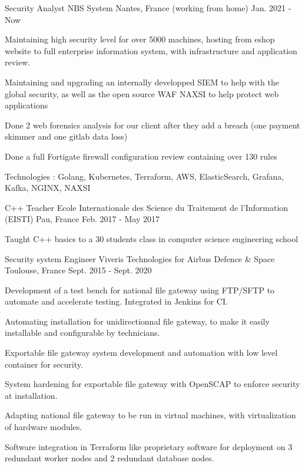 \begin{cventries}
  \cventry
  {Security Analyst}
  {NBS System}
  {Nantes, France (working from home)}
  {Jan. 2021 - Now}
  {
  \begin{cvitems}
    \item {Maintaining high security level for over 5000 machines, hosting from eshop website to full enterprise information system, with infrastructure and application review.}
    \item {Maintaining and upgrading an internally developped SIEM to help with the global security, as well as the open source WAF NAXSI to help protect web applications}
    \item {Done 2 web forensics analysis for our client after they add a breach (one payment skimmer and one gitlab data loss)}
    \item {Done a full Fortigate firewall configuration review containing over 130 rules}
    \item {Technologies : Golang, Kubernetes, Terraform, AWS, ElasticSearch, Grafana, Kafka, NGINX, NAXSI}
  \end{cvitems}
  }
  \cventry
  {C++ Teacher}
  {Ecole Internationale des Science du Traitement de l'Information (EISTI)}
  {Pau, France}
  {Feb. 2017 - May 2017}
  {
  \begin{cvitems}
    \item {Taught C++ basics to a 30 students class in computer science engineering school}
  \end{cvitems}
  }
  \cventry
  {Security system Engineer}
  {Viveris Technologies for Airbus Defence \& Space}
  {Toulouse, France}
  {Sept. 2015 - Sept. 2020}
  {
  \begin{cvitems}
    \item {Development of a test bench for national file gateway using FTP/SFTP to automate and accelerate testing. Integrated in Jenkins for CI.}
    \item {Automating installation for unidirectionnal file gateway, to make it easily installable and configurable by technicians.}
    \item {Exportable file gateway system development and automation with low level container for security.}
    \item {System hardening for exportable file gateway with OpenSCAP to enforce security at installation.}
    \item {Adapting national file gateway to be run in virtual machines, with virtualization of hardware modules.}
    \item {Software integration in Terraform like proprietary software for deployment on 3 redundant worker nodes and 2 redundant database nodes.}

\end{cvitems}}
\end{cventries}
